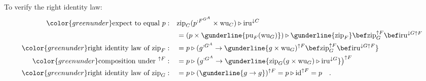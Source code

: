 To verify the right identity law:
\begin{align*}
{\color{greenunder}\text{expect to equal }p:}\quad & \text{zip}_{C}(p^{:F^{G^{A}}}\times\text{wu}_{C})\triangleright\text{iru}^{\downarrow C}\\
 & =(p\times\gunderline{\text{pu}_{F}(\text{wu}_{G})})\triangleright\gunderline{\text{zip}_{F}}\bef\text{zip}_{G}^{\uparrow F}\bef\text{iru}^{\downarrow G\uparrow F}\\
{\color{greenunder}\text{right identity law of }\text{zip}_{F}:}\quad & =p\triangleright(g^{:G^{A}}\rightarrow\gunderline{g\times\text{wu}_{G})^{\uparrow F}\bef\text{zip}_{G}^{\uparrow F}\bef\text{iru}^{\downarrow G\uparrow F}}\\
{\color{greenunder}\text{composition under }^{\uparrow F}:}\quad & =p\triangleright\big(g^{:G^{A}}\rightarrow\gunderline{\text{zip}_{G}(g\times\text{wu}_{G})\triangleright\text{iru}^{\downarrow G}}\big)^{\uparrow F}\\
{\color{greenunder}\text{right identity law of }\text{zip}_{G}:}\quad & =p\triangleright(\gunderline{g\rightarrow g})^{\uparrow F}=p\triangleright\text{id}^{\uparrow F}=p\quad.
\end{align*}

